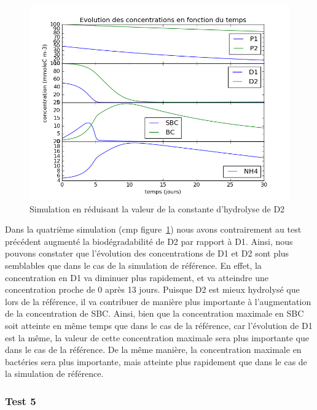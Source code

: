 \par{
\begin{figure}[h!]
  \includegraphics[width=\textwidth]{partie2/Test4.png}
  \caption{Simulation en r\'eduisant la valeur de la constante d'hydrolyse de D2
  }
  \label{fig:partie2test4}
\end{figure}
}
\par{
Dans la quatrième simulation (cmp figure~\ref{fig:partie2test4})
nous avons contrairement au test pr\'ec\'edent augment\'e la biod\'egradabilit\'e de D2 par rapport \`a D1. Ainsi, nous pouvons constater que l'\'evolution des concentrations de D1 et D2 sont plus semblables que dans le cas de la simulation de r\'ef\'erence. En effet, la concentration en D1 va diminuer plus rapidement, et va atteindre une concentration proche de 0 apr\`es 13 jours. Puisque D2 est mieux hydrolys\'e que lors de la r\'ef\'erence, il va contribuer de mani\`ere plus importante \`a l'augmentation de la concentration de SBC. Ainsi, bien que la concentration maximale en SBC soit atteinte en m\^eme temps que dans le cas de la r\'ef\'erence, car l'\'evolution de D1 est la m\^eme, la valeur de cette concentration maximale sera plus importante que dans le cas de la r\'ef\'erence. De la m\^eme mani\`ere, la concentration maximale en bact\'eries sera plus importante, mais atteinte plus rapidement que dans le cas de la simulation de r\'ef\'erence.
}

\FloatBarrier
\newpage
\subsubsection{Test 5}

